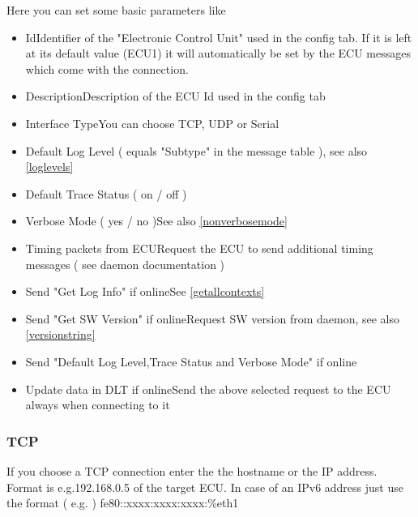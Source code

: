 \documentclass[a4paper,11pt]{article}
\begin{document}
Here you can set some basic parameters like

\begin{itemize}
 \item Id\linebreak Identifier of the "Electronic Control Unit" used in the config tab. If it is left at its default value (ECU1) it will automatically be set by the ECU messages which come with the connection.
 \item Description\linebreak Description of the ECU Id used in the config tab
 \item Interface Type\linebreak You can choose TCP, UDP or Serial
 \item Default Log Level ( equals "Subtype" in the message table ), see also \autoref{loglevels}
 \item Default Trace Status ( on / off )
 \item Verbose Mode ( yes / no )\linebreak See also \autoref{nonverbosemode}
 \item Timing packets from ECU\linebreak Request the ECU to send additional timing messages ( see daemon documentation )
 \item Send "Get Log Info" if online\linebreak See \autoref{getallcontexts}
 \item Send "Get SW Version" if online\linebreak Request SW version from daemon, see also \autoref{versionstring}
 \item Send "Default Log Level,Trace Status and Verbose Mode" if online
 \item Update data in DLT if online\linebreak Send the above selected request to the ECU always when connecting to it
\end{itemize}

\subsubsection{TCP}

If you choose a TCP connection enter the the hostname or the IP address.\linebreak
Format is e.g.192.168.0.5 of the target ECU.
\linebreak
In case of an IPv6 address just use the format ( e.g. ) fe80::xxxx:xxxx:xxxx:\%eth1
\end{document}
